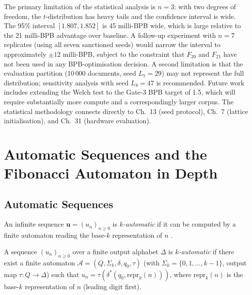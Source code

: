 The primary limitation of the statistical analysis
is \(n = 3\): with two degrees of freedom, the
\(t\)-distribution has heavy tails and the
confidence interval is wide. The 95\% interval
\([1.807, 1.852]\) is 45 milli-BPB wide, which is
large relative to the 21 milli-BPB advantage over
baseline. A follow-up experiment with \(n = 7\)
replicates (using all seven sanctioned seeds)
would narrow the interval to approximately
\(\pm 12\) milli-BPB, subject to the constraint
that \(F_{20}\) and \(F_{21}\) have not been used
in any BPB-optimisation decision. A second
limitation is that the evaluation partition (10\,000
documents, seed \(L_7 = 29\)) may not
represent the full distribution; sensitivity
analysis with seed \(L_8 = 47\) is recommended.
Future work includes extending the Welch test to
the Gate-3 BPB target of 1.5, which will require
substantially more compute and a correspondingly
larger corpus. The statistical methodology
connects directly to Ch.~13 (seed protocol), Ch.~7
(lattice initialisation), and Ch.~31 (hardware
evaluation).

\section{Automatic Sequences and the Fibonacci Automaton in Depth}
\label{sec:ch19-automatic}

\subsection{Automatic Sequences}
\label{subsec:ch19-automatic-def}

An infinite sequence \(\mathbf{u}=(u_n)_{n\geq 0}\) is
\emph{\(k\)-automatic} if it can be computed by a finite automaton
reading the base-\(k\) representation of \(n\)
\cite{allouche2003automatic}.

\begin{definition}\label{def:k-automatic}
  A sequence \((u_n)_{n\geq 0}\) over a finite output alphabet
  \(\Delta\) is \emph{\(k\)-automatic} if there exist a finite
  automaton \(\mathcal{A}=(Q,\Sigma_k,\delta,q_0,\tau)\) (with
  \(\Sigma_k=\{0,1,\ldots,k-1\}\), output map
  \(\tau\colon Q\to\Delta\)) such that
  \(u_n = \tau(\delta^*(q_0, \mathrm{repr}_k(n)))\),
  where \(\mathrm{repr}_k(n)\) is the base-\(k\) representation
  of \(n\) (leading digit first).
\end{definition}

